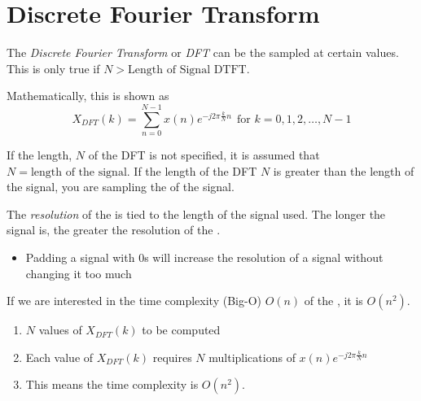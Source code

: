 \section{Discrete Fourier Transform}\label{sec:DFT}
\begin{definition}\label{def:DFT}
  The \emph{Discrete Fourier Transform} or \emph{DFT} can be the  sampled at certain values.
  This is only true if $N > \text{Length of Signal DTFT}$.

  Mathematically, this is shown as
  \begin{equation}\label{eq:DFT}
    X_{DFT}(k) = \sum\limits_{n=0}^{N-1} x(n) e^{-j 2\pi \frac{k}{N} n} \:\: \text{for } k=0, 1, 2, \ldots, N-1
  \end{equation}

  \begin{remark}
    If the length, $N$ of the DFT is not specified, it is assumed that $N = \text{length of the signal}$.
    If the length of the DFT $N$ is greater than the length of the signal, you are sampling the  of the signal.
  \end{remark}

  \begin{remark}\label{rmk:DFT_Resolution}
    The \emph{resolution} of the  is tied to the length of the signal used.
    The longer the signal is, the greater the resolution of the .
    \begin{itemize}[noitemsep]
    \item Padding a signal with 0s will increase the resolution of a signal without changing it too much
    \end{itemize}
  \end{remark}

  \begin{remark}\label{rmk:DFT_Time_Complexity}
    If we are interested in the time complexity (Big-O) $O(n)$ of the , it is $O(n^{2})$.
    \begin{enumerate}[noitemsep]
    \item $N$ values of $X_{DFT}(k)$ to be computed
    \item Each value of $X_{DFT}(k)$ requires $N$ multiplications of $x(n) e^{-j 2\pi \frac{k}{N} n}$
    \item This means the time complexity is $O(n^{2})$.
    \end{enumerate}
  \end{remark}
\end{definition}

